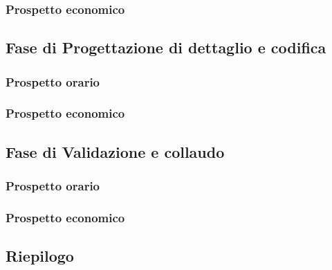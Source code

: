 \subsubsection{Prospetto economico}

\subsection{Fase di Progettazione di dettaglio e codifica}
\subsubsection{Prospetto orario}

\subsubsection{Prospetto economico}

\subsection{Fase di Validazione e collaudo}
\subsubsection{Prospetto orario}

\subsubsection{Prospetto economico}

\subsection{Riepilogo}